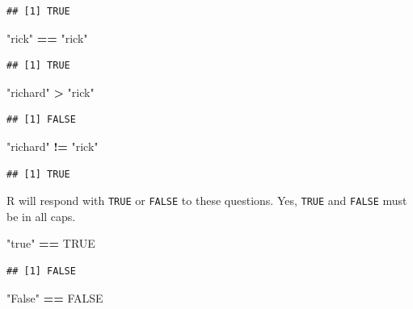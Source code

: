\documentclass[]{article}
\newenvironment{Shaded}{\begin{snugshade}}{\end{snugshade}}
\newcommand{\StringTok}[1]{\textcolor[rgb]{0.31,0.60,0.02}{#1}}
\newcommand{\OtherTok}[1]{\textcolor[rgb]{0.56,0.35,0.01}{#1}}
\newcommand{\OperatorTok}[1]{\textcolor[rgb]{0.81,0.36,0.00}{\textbf{#1}}}
\begin{document}
\begin{verbatim}
## [1] TRUE
\end{verbatim}

\begin{Shaded}
\begin{Highlighting}[]
\StringTok{"rick"} \OperatorTok{==}\StringTok{ "rick"}
\end{Highlighting}
\end{Shaded}

\begin{verbatim}
## [1] TRUE
\end{verbatim}

\begin{Shaded}
\begin{Highlighting}[]
\StringTok{"richard"} \OperatorTok{>}\StringTok{ "rick"}
\end{Highlighting}
\end{Shaded}

\begin{verbatim}
## [1] FALSE
\end{verbatim}

\begin{Shaded}
\begin{Highlighting}[]
\StringTok{"richard"} \OperatorTok{!=}\StringTok{ "rick"}
\end{Highlighting}
\end{Shaded}

\begin{verbatim}
## [1] TRUE
\end{verbatim}

R will respond with \texttt{TRUE} or \texttt{FALSE} to these questions.
Yes, \texttt{TRUE} and \texttt{FALSE} must be in all caps.

\begin{Shaded}
\begin{Highlighting}[]
\StringTok{"true"} \OperatorTok{==}\StringTok{ }\OtherTok{TRUE}
\end{Highlighting}
\end{Shaded}

\begin{verbatim}
## [1] FALSE
\end{verbatim}

\begin{Shaded}
\begin{Highlighting}[]
\StringTok{"False"} \OperatorTok{==}\StringTok{ }\OtherTok{FALSE}
\end{Highlighting}
\end{Shaded}
\end{document}
